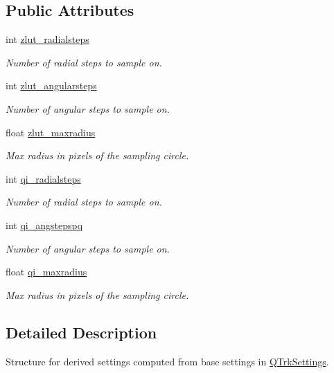 \subsection*{Public Attributes}
\begin{DoxyCompactItemize}
\item 
int \hyperlink{struct_q_trk_computed_config_ad1a121fa7d3152df6788ff285e4d2dc6}{zlut\+\_\+radialsteps}
\begin{DoxyCompactList}\small\item\em Number of radial steps to sample on. \end{DoxyCompactList}\item 
int \hyperlink{struct_q_trk_computed_config_a01653574d81ab70e4910c984fb7f7482}{zlut\+\_\+angularsteps}
\begin{DoxyCompactList}\small\item\em Number of angular steps to sample on. \end{DoxyCompactList}\item 
float \hyperlink{struct_q_trk_computed_config_a13ceb0d4551d3bd5343ecce7a093d65b}{zlut\+\_\+maxradius}
\begin{DoxyCompactList}\small\item\em Max radius in pixels of the sampling circle. \end{DoxyCompactList}\item 
int \hyperlink{struct_q_trk_computed_config_ab1a11e7a567a3267c57f77626c6c9c93}{qi\+\_\+radialsteps}
\begin{DoxyCompactList}\small\item\em Number of radial steps to sample on. \end{DoxyCompactList}\item 
int \hyperlink{struct_q_trk_computed_config_a1ba87257b24e5b7e427aa92dd4114792}{qi\+\_\+angstepspq}
\begin{DoxyCompactList}\small\item\em Number of angular steps to sample on. \end{DoxyCompactList}\item 
float \hyperlink{struct_q_trk_computed_config_a9784dbeb638bde1f3204f9ca5af720c6}{qi\+\_\+maxradius}
\begin{DoxyCompactList}\small\item\em Max radius in pixels of the sampling circle. \end{DoxyCompactList}\end{DoxyCompactItemize}


\subsection{Detailed Description}
Structure for derived settings computed from base settings in \hyperlink{struct_q_trk_settings}{Q\+Trk\+Settings}. 

